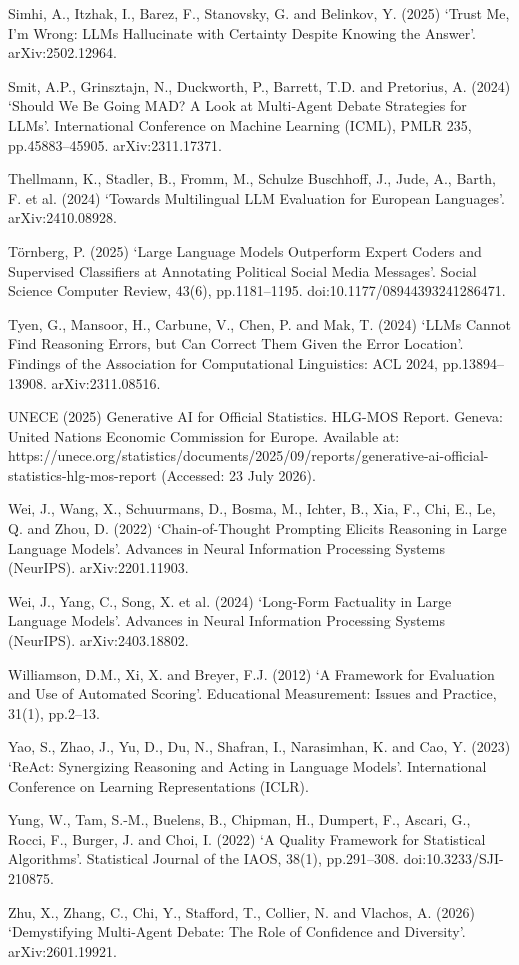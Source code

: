 Simhi, A., Itzhak, I., Barez, F., Stanovsky, G. and Belinkov, Y. (2025) `Trust Me, I'm Wrong: LLMs Hallucinate with Certainty Despite Knowing the Answer'. arXiv:2502.12964.

Smit, A.P., Grinsztajn, N., Duckworth, P., Barrett, T.D. and Pretorius, A. (2024) `Should We Be Going MAD? A Look at Multi-Agent Debate Strategies for LLMs'. International Conference on Machine Learning (ICML), PMLR 235, pp.45883--45905. arXiv:2311.17371.

Thellmann, K., Stadler, B., Fromm, M., Schulze Buschhoff, J., Jude, A., Barth, F. et al. (2024) `Towards Multilingual LLM Evaluation for European Languages'. arXiv:2410.08928.

Törnberg, P. (2025) `Large Language Models Outperform Expert Coders and Supervised Classifiers at Annotating Political Social Media Messages'. Social Science Computer Review, 43(6), pp.1181--1195. doi:10.1177/08944393241286471.

Tyen, G., Mansoor, H., Carbune, V., Chen, P. and Mak, T. (2024) `LLMs Cannot Find Reasoning Errors, but Can Correct Them Given the Error Location'. Findings of the Association for Computational Linguistics: ACL 2024, pp.13894--13908. arXiv:2311.08516.

UNECE (2025) Generative AI for Official Statistics. HLG-MOS Report. Geneva: United Nations Economic Commission for Europe. Available at: https://unece.org/statistics/documents/2025/09/reports/generative-ai-official-statistics-hlg-mos-report (Accessed: 23 July 2026).

Wei, J., Wang, X., Schuurmans, D., Bosma, M., Ichter, B., Xia, F., Chi, E., Le, Q. and Zhou, D. (2022) `Chain-of-Thought Prompting Elicits Reasoning in Large Language Models'. Advances in Neural Information Processing Systems (NeurIPS). arXiv:2201.11903.

Wei, J., Yang, C., Song, X. et al. (2024) `Long-Form Factuality in Large Language Models'. Advances in Neural Information Processing Systems (NeurIPS). arXiv:2403.18802.

Williamson, D.M., Xi, X. and Breyer, F.J. (2012) `A Framework for Evaluation and Use of Automated Scoring'. Educational Measurement: Issues and Practice, 31(1), pp.2--13.

Yao, S., Zhao, J., Yu, D., Du, N., Shafran, I., Narasimhan, K. and Cao, Y. (2023) `ReAct: Synergizing Reasoning and Acting in Language Models'. International Conference on Learning Representations (ICLR).

Yung, W., Tam, S.-M., Buelens, B., Chipman, H., Dumpert, F., Ascari, G., Rocci, F., Burger, J. and Choi, I. (2022) `A Quality Framework for Statistical Algorithms'. Statistical Journal of the IAOS, 38(1), pp.291--308. doi:10.3233/SJI-210875.

Zhu, X., Zhang, C., Chi, Y., Stafford, T., Collier, N. and Vlachos, A. (2026) `Demystifying Multi-Agent Debate: The Role of Confidence and Diversity'. arXiv:2601.19921.
